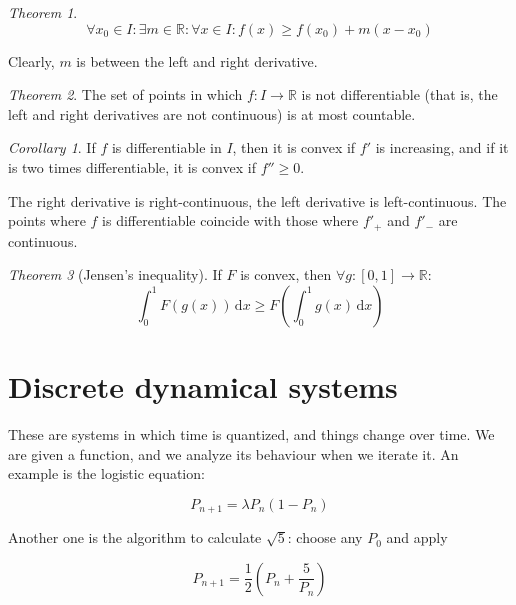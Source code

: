 \documentclass[12pt,a4paper]{report}
\numberwithin{equation}{section}
\theoremstyle{definition}
\theoremstyle{remark}
\newtheorem{theorem}{Theorem}[section]
\newtheorem{corollary}{Corollary}[theorem]
\begin{document}
\begin{theorem}
\begin{equation}
\forall x_0 \in I: \exists m \in \mathbb{R}: \forall x \in I: f(x) \geq f(x_0) + m (x - x_0)
\end{equation}

Clearly, $m$ is between the left and right derivative.
\end{theorem}

\begin{theorem}
The set of points in which $f: I \rightarrow \mathbb{R}$ is not differentiable (that is, the left and right derivatives are not continuous) is at most countable.
\end{theorem}

\begin{corollary}
If $f$ is differentiable in $I$, then it is convex if $f'$ is increasing, and if it is two times differentiable, it is convex if $f''\geq 0$.
\end{corollary}

The right derivative is right-continuous, the left derivative is left-continuous. The points where $f$ is differentiable coincide with those where $f'_+$ and $f'_-$ are continuous.

\begin{theorem}[Jensen's inequality]
If $F$ is convex, then $\forall g: [0, 1] \rightarrow \mathbb{R}$:
\begin{equation}
\int^{1}_{0} F(g(x)) \, \text{d} x  \geq F\left( \int^{1}_{0} g(x) \, \text{d}x \right)
\end{equation}
\end{theorem}

\chapter{Discrete dynamical systems}

These are systems in which time is quantized, and things change over time. We are given a function, and we analyze its behaviour when we iterate it. An example is the logistic equation:

\begin{equation}
P_{n+1} = \lambda P_n (1- P_n)
\end{equation}

Another one is the algorithm to calculate $\sqrt{5}$: choose any $P_0$ and apply

\begin{equation}
P_{n+1} = \frac{1}{2} \left( P_n + \frac{5}{P_n} \right)
\end{equation}
\end{document}
